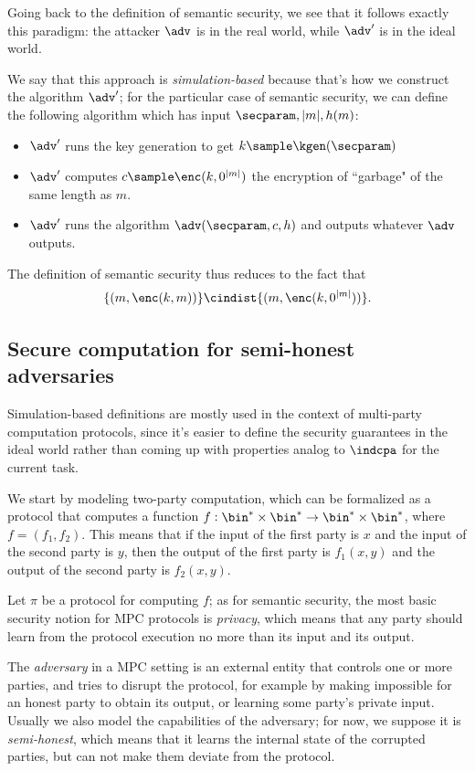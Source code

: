 Going back to the definition of semantic security, we see that it follows exactly this paradigm: the attacker $\adv$ is in the real world, while $\adv'$ is in the ideal world.

We say that this approach is \emph{simulation-based} because that's how we construct the algorithm $\adv'$; for the particular case of semantic security, we can define the following algorithm which has input $\secparam,|m|,h(m)$:
\begin{itemize}
    \item $\adv'$ runs the key generation to get $k\sample\kgen(\secparam)$
    \item $\adv'$ computes $c\sample\enc(k,0^{|m|})$ the encryption of ``garbage" of the same length as $m$.
    \item $\adv'$ runs the algorithm $\adv(\secparam, c, h)$ and outputs whatever $\adv$ outputs.
\end{itemize}

The definition of semantic security thus reduces to the fact that $$\{ (m, \enc(k,m)) \} \cindist \{ (m,\enc(k,0^{|m|})) \}. $$

\subsection{Secure computation for semi-honest adversaries}
Simulation-based definitions are mostly used in the context of multi-party computation protocols, since it's easier to define the security guarantees in the ideal world rather than coming up with properties analog to $\indcpa$ for the current task.

We start by modeling two-party computation, which can be formalized as a protocol that computes a function $f:\bin^\ast\times\bin^\ast \to \bin^\ast\times\bin^\ast$, where $f=(f_1,f_2)$. This means that if the input of the first party is $x$ and the input of the second party is $y$, then the output of the first party is $f_1(x,y)$ and the output of the second party is $f_2(x,y)$.

Let $\pi$ be a protocol for computing $f$; as for semantic security, the most basic security notion for MPC protocols is \emph{privacy}, which means that any party should learn from the protocol execution no more than its input and its output.

The \emph{adversary} in a MPC setting is an external entity that controls one or more parties, and tries to disrupt the protocol, for example by making impossible for an honest party to obtain its output, or learning some party's private input. Usually we also model the capabilities of the adversary; for now, we suppose it is \emph{semi-honest}, which means that it learns the internal state of the corrupted parties, but can not make them deviate from the protocol.

